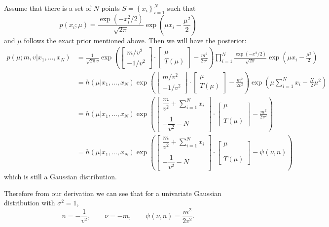 \documentclass[letterpaper, 12pt]{article}
\begin{document}
Assume that there is a set of $N$ points $S=\left\{x_i \right\}_{i=1}^N$ such that $$p(x_i;\mu)=\frac{\exp(-x_i^2/2)}{\sqrt{2\pi}}\exp\left( \mu x_i-\frac{\mu^2}{2} \right)$$ and $\mu$ follows the exact prior mentioned above. Then we will have the posterior:
\begin{align*}
    p(\mu;m,v|x_1,\ldots,x_N)&=\frac{1}{\sqrt{2\pi}v}\exp\left( \begin{bmatrix}
        m/v^2\\-1/v^2
    \end{bmatrix}\cdot\begin{bmatrix}
        \mu\\T(\mu)
    \end{bmatrix}-\frac{m^2}{2v^2} \right)\prod_{i=1}^N\frac{\exp(-x^2/2)}{\sqrt{2\pi}}\exp\left( \mu x_i-\frac{\mu^2}{2} \right)\\
    &=h(\mu|x_1,\ldots,x_N)\exp\left( \begin{bmatrix}
        m/v^2\\-1/v^2
    \end{bmatrix}\cdot\begin{bmatrix}
        \mu\\T(\mu)
    \end{bmatrix}-\frac{m^2}{2v^2} \right)\exp\left( \mu\sum_{i=1}^Nx_i-\frac{N}{2}\mu^2 \right)\\
    &=h(\mu|x_1,\ldots,x_N)\exp\left( \begin{bmatrix}
        \dfrac{m}{v^2}+\sum_{i=1}^Nx_i\\~\\-\dfrac{1}{v^2}-N
    \end{bmatrix}\cdot\begin{bmatrix}
        \mu\\~\\~\\T(\mu)
    \end{bmatrix}-\frac{m^2}{2v^2} \right)\\&=h(\mu|x_1,\ldots,x_N)\exp\left( \begin{bmatrix}
        \dfrac{m}{v^2}+\sum_{i=1}^Nx_i\\~\\-\dfrac{1}{v^2}-N
    \end{bmatrix}\cdot\begin{bmatrix}
        \mu\\~\\~\\T(\mu)
    \end{bmatrix}-\psi(\nu,n) \right)
\end{align*}
which is still a Gaussian distribution.

Therefore from our derivation we can see that for a univariate Gaussian distribution with $\sigma^2=1$, $$n=-\frac{1}{v^2},\qquad \nu=-m,\qquad\psi(\nu,n)=\frac{m^2}{2v^2}.$$
\end{document}
